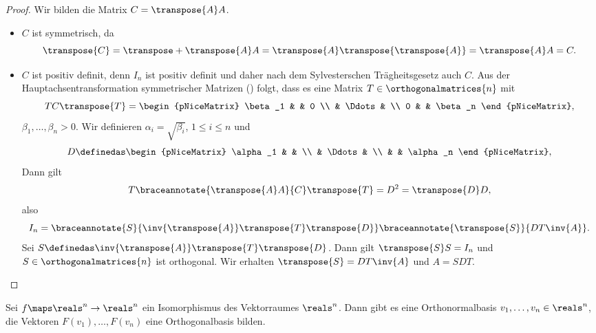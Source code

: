 \begin{proof}
  Wir bilden die Matrix \( C=\transpose{A}A \).
  \begin{itemize}
    \item \( C \) ist symmetrisch, da
    \begin{equation*}
      \transpose{C}=\transpose+{\transpose{A}A}=\transpose{A}\transpose{\transpose{A}}=\transpose{A}A=C.
    \end{equation*}
    \item \( C \) ist positiv definit, denn \( I_n \) ist positiv definit und daher nach dem Sylvesterschen Trägheitsgesetz auch \( C \). Aus der Hauptachsentransformation symmetrischer Matrizen () folgt, dass es eine Matrix \( T\in \orthogonalmatrices{n} \) mit
    \begin{equation*}
      TC\transpose{T}=\begin{pNiceMatrix}
        \beta_1 &  & 0 \\
         & \Ddots &  \\
        0 &  & \beta_n
      \end{pNiceMatrix},
    \end{equation*}
    \( \beta_1,\dotsc,\beta_n>0 \). Wir definieren \( \alpha_i=\sqrt{\beta_i} \), \( 1\leq i\leq n \) und 
    \begin{equation*}
      D\definedas \begin{pNiceMatrix} \alpha_1 &  &  \\  & \Ddots &  \\  &  & \alpha_n \end{pNiceMatrix},
    \end{equation*}
    Dann gilt
    \begin{equation*}
      T\braceannotate{\transpose{A}A}{C}\transpose{T}=D^2=\transpose{D}D,
    \end{equation*}
    also
    \begin{equation*}
      I_n=\braceannotate{S}{\inv{\transpose{A}}\transpose{T}\transpose{D}}\braceannotate{\transpose{S}}{DT\inv{A}}.
    \end{equation*}
    Sei \( S\definedas \inv{\transpose{A}}\transpose{T}\transpose{D} \). Dann gilt \( \transpose{S}S=I_n \) und \( S\in \orthogonalmatrices{n} \) ist orthogonal. Wir erhalten \( \transpose{S}=DT\inv{A} \) und \( A=SDT \).
  \end{itemize}
\end{proof}
\begin{korollar*}
  Sei \( f\maps \reals^n\to \reals^n \) ein Isomorphismus des Vektorraumes \( \reals^n \). Dann gibt es eine Orthonormalbasis \( v_1,\dotsc, v_n\in \reals^n \), \sd die Vektoren \( F(v_1),\dotsc,F(v_n) \) eine Orthogonalbasis bilden.
\end{korollar*}
